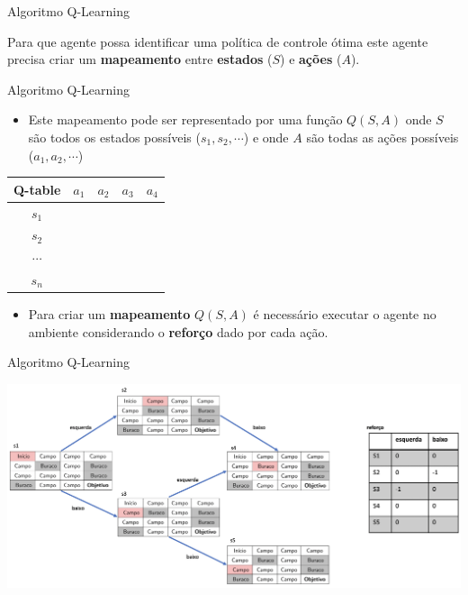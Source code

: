 \documentclass{beamer}
\begin{document}
\begin{frame}{Algoritmo Q-Learning}
	
Para que agente possa identificar uma política de controle ótima este agente 
precisa criar um \textbf{mapeamento} entre \textbf{estados} ($S$) e \textbf{ações} ($A$).

\end{frame}

\begin{frame}{Algoritmo Q-Learning}
	
\begin{itemize}
	
	\item Este mapeamento pode ser representado por uma função $Q(S,A)$ onde $S$ são 
	todos os estados possíveis ($s_{1}, s_{2}, \cdots$) e onde $A$ são todas as 
	ações possíveis ($a_{1}, a_{2}, \cdots$)

\end{itemize}

	\begin{center}
	\begin{tabular}{ |c|c|c|c|c| } 
		\hline
		 \textbf{Q-table}  & $a_{1}$ & $a_{2}$ & $a_{3}$& $a_{4}$ \\
		 \hline
		$s_{1}$&  &  &  & \\ 
		\hline
		$s_{2}$&  &  &  & \\ 
\hline
		$\cdots$&  &  &  & \\ 
\hline
		$s_{n}$&  &  &  & \\ 
\hline
	\end{tabular}
\end{center}

\begin{itemize}
	\item Para criar um \textbf{mapeamento} $Q(S,A)$ é necessário executar o 
	agente no ambiente considerando o \textbf{reforço} dado por cada ação. 
\end{itemize}

\end{frame}


\begin{frame}{Algoritmo Q-Learning}

  \begin{center}
	\includegraphics[width=\textwidth]{figuras/mapa1.png}
\end{center}

\end{frame}
\end{document}
